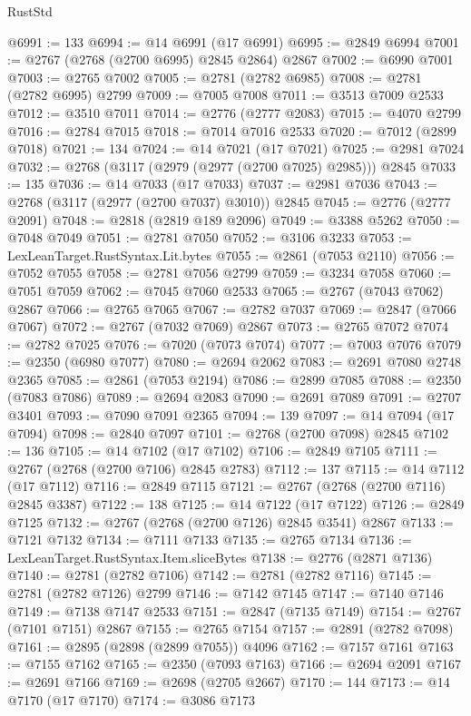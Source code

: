 \begin{lexlean}{RustStd}
\begin{coremodule}
@6991 := 133
@6994 := @14 @6991 (@17 @6991)
@6995 := @2849 @6994
@7001 := @2767 (@2768 (@2700 @6995) @2845 @2864) @2867
@7002 := @6990 @7001
@7003 := @2765 @7002
@7005 := @2781 (@2782 @6985)
@7008 := @2781 (@2782 @6995) @2799
@7009 := @7005 @7008
@7011 := @3513 @7009 @2533
@7012 := @3510 @7011
@7014 := @2776 (@2777 @2083)
@7015 := @4070 @2799
@7016 := @2784 @7015
@7018 := @7014 @7016 @2533
@7020 := @7012 (@2899 @7018)
@7021 := 134
@7024 := @14 @7021 (@17 @7021)
@7025 := @2981 @7024
@7032 := @2768 (@3117 (@2979 (@2977 (@2700 @7025) @2985))) @2845
@7033 := 135
@7036 := @14 @7033 (@17 @7033)
@7037 := @2981 @7036
@7043 := @2768 (@3117 (@2977 (@2700 @7037) @3010)) @2845
@7045 := @2776 (@2777 @2091)
@7048 := @2818 (@2819 @189 @2096)
@7049 := @3388 @5262
@7050 := @7048 @7049
@7051 := @2781 @7050
@7052 := @3106 @3233
@7053 := LexLeanTarget.RustSyntax.Lit.bytes
@7055 := @2861 (@7053 @2110)
@7056 := @7052 @7055
@7058 := @2781 @7056 @2799
@7059 := @3234 @7058
@7060 := @7051 @7059
@7062 := @7045 @7060 @2533
@7065 := @2767 (@7043 @7062) @2867
@7066 := @2765 @7065
@7067 := @2782 @7037
@7069 := @2847 (@7066 @7067)
@7072 := @2767 (@7032 @7069) @2867
@7073 := @2765 @7072
@7074 := @2782 @7025
@7076 := @7020 (@7073 @7074)
@7077 := @7003 @7076
@7079 := @2350 (@6980 @7077)
@7080 := @2694 @2062
@7083 := @2691 @7080 @2748 @2365
@7085 := @2861 (@7053 @2194)
@7086 := @2899 @7085
@7088 := @2350 (@7083 @7086)
@7089 := @2694 @2083
@7090 := @2691 @7089
@7091 := @2707 @3401
@7093 := @7090 @7091 @2365
@7094 := 139
@7097 := @14 @7094 (@17 @7094)
@7098 := @2840 @7097
@7101 := @2768 (@2700 @7098) @2845
@7102 := 136
@7105 := @14 @7102 (@17 @7102)
@7106 := @2849 @7105
@7111 := @2767 (@2768 (@2700 @7106) @2845 @2783)
@7112 := 137
@7115 := @14 @7112 (@17 @7112)
@7116 := @2849 @7115
@7121 := @2767 (@2768 (@2700 @7116) @2845 @3387)
@7122 := 138
@7125 := @14 @7122 (@17 @7122)
@7126 := @2849 @7125
@7132 := @2767 (@2768 (@2700 @7126) @2845 @3541) @2867
@7133 := @7121 @7132
@7134 := @7111 @7133
@7135 := @2765 @7134
@7136 := LexLeanTarget.RustSyntax.Item.sliceBytes
@7138 := @2776 (@2871 @7136)
@7140 := @2781 (@2782 @7106)
@7142 := @2781 (@2782 @7116)
@7145 := @2781 (@2782 @7126) @2799
@7146 := @7142 @7145
@7147 := @7140 @7146
@7149 := @7138 @7147 @2533
@7151 := @2847 (@7135 @7149)
@7154 := @2767 (@7101 @7151) @2867
@7155 := @2765 @7154
@7157 := @2891 (@2782 @7098)
@7161 := @2895 (@2898 (@2899 @7055)) @4096
@7162 := @7157 @7161
@7163 := @7155 @7162
@7165 := @2350 (@7093 @7163)
@7166 := @2694 @2091
@7167 := @2691 @7166
@7169 := @2698 (@2705 @2667)
@7170 := 144
@7173 := @14 @7170 (@17 @7170)
@7174 := @3086 @7173

\end{coremodule}
\end{lexlean}
